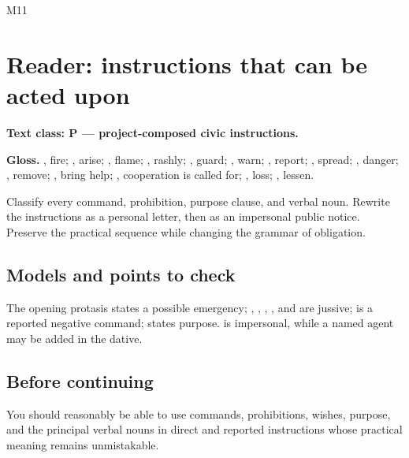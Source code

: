 \begin{courseunit}{M11}
\chapter{Reader: instructions that can be acted upon}

\textbf{Text class: P --- project-composed civic instructions.}


\textbf{Gloss.} , fire; , arise;
, flame; , rashly; , guard;
, warn; , report; , spread;
, danger; , remove; , bring
help; , cooperation is called for;
, loss; , lessen.

Classify every command, prohibition, purpose clause, and verbal noun.  Rewrite
the instructions as a personal letter, then as an impersonal public notice.
Preserve the practical sequence while changing the grammar of obligation.

\ifsolutions
\section{Models and points to check}
The opening protasis states a possible emergency; ,
, , , and  are
jussive;  is a reported negative command;
 states purpose.   is impersonal,
while a named agent may be added in the dative.
\else
\section{Before continuing}
You should reasonably be able to use commands, prohibitions, wishes, purpose,
and the principal verbal nouns in direct and reported instructions whose
practical meaning remains unmistakable.
\fi
\end{courseunit}

